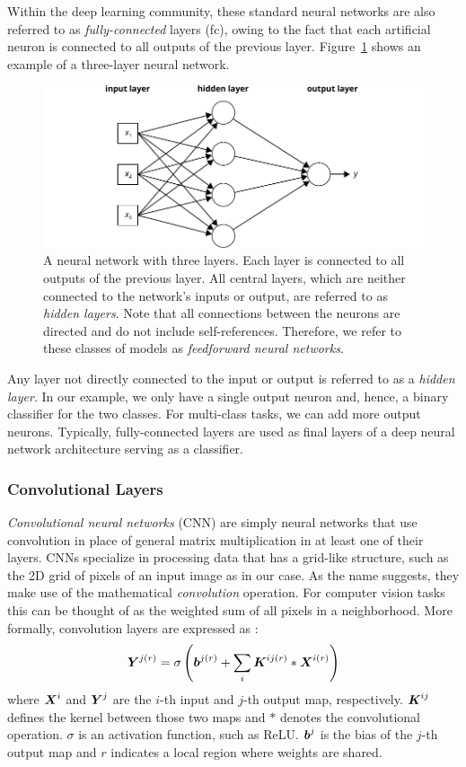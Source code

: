 Within the deep learning community, these standard neural networks are also referred to as \emph{fully-connected} layers (\ac{fc}), owing to the fact that each artificial neuron is connected to all outputs of the previous layer. Figure~\ref{fig:nn} shows an example of a three-layer neural network.
%
	\begin{figure}[tp]
  		\centering
    	\includegraphics{img/nn.pdf}
    	\caption{A neural network with three layers. Each layer is connected to all outputs of the previous layer. All central layers, which are neither connected to the network's inputs or output, are referred to as \emph{hidden layers}. Note that all connections between the neurons are directed and do not include self-references. Therefore, we refer to these classes of models as \emph{feedforward neural networks}.}
    	\label{fig:nn}
	\end{figure}
%
Any layer not directly connected to the input or output is referred to as a \emph{hidden layer}. In our example, we only have a single output neuron and, hence, a binary classifier for the two classes. For multi-class tasks, we can add more output neurons. Typically, fully-connected layers are used as final layers of a deep neural network architecture serving as a classifier.

\subsubsection{Convolutional Layers}
\emph{Convolutional neural networks} (CNN) are simply neural networks that use convolution in place of general matrix multiplication in at least one of their layers. CNNs specialize in processing data that has a grid-like structure, such as the 2D grid of pixels of an input image as in our case. As the name suggests, they make use of the mathematical \emph{convolution} operation. For computer vision tasks this can be thought of as the weighted sum of all pixels in a neighborhood. More formally, convolution layers are expressed as \cite{sun2014deep}: 
%
$$
\boldsymbol{Y}^{j(r)} = \sigma \left( \boldsymbol{b}^{j(r)} + \sum_i \boldsymbol{K}^{ij(r)} \ast \boldsymbol{X}^{i(r)} \right)
$$
%
where $\boldsymbol{X}^i$ and $\boldsymbol{Y}^j$ are the $i$-th input and $j$-th output map, respectively. $\boldsymbol{K}^{ij}$ defines the kernel between those two maps and $\ast$ denotes the convolutional operation. $\sigma$ is an activation function, such as ReLU. $\boldsymbol{b}^j$ is the bias of the $j$-th output map and $r$ indicates a local region where weights are shared.

